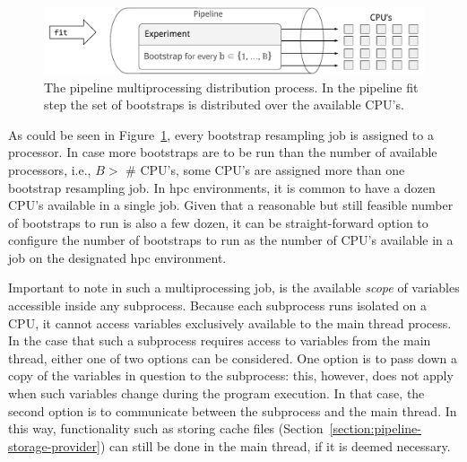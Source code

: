 \documentclass[../main.tex]{subfiles}
\begin{document}
\begin{figure}[ht]
    \centering
    \includegraphics[width=0.8\linewidth]{report/images/schematic-pipeline-multiprocessing.pdf}
    \caption{The pipeline multiprocessing distribution process. In the pipeline fit step the set of bootstraps is distributed over the available CPU's.}
    \label{fig:schematic-pipeline-multiprocessing}
\end{figure}

As could be seen in Figure~\ref{fig:schematic-pipeline-multiprocessing}, every bootstrap resampling job is assigned to a processor. In case more bootstraps are to be run than the number of available processors, i.e., $B >$ \# CPU's, some CPU's are assigned more than one bootstrap resampling job. In \gls{hpc} environments, it is common to have a dozen CPU's available in a single job. Given that a reasonable but still feasible number of bootstraps to run is also a few dozen, it can be straight-forward option to configure the number of bootstraps to run as the number of CPU's available in a job on the designated \gls{hpc} environment.

Important to note in such a multiprocessing job, is the available \textit{scope} of variables accessible inside any subprocess. Because each subprocess runs isolated on a CPU, it cannot access variables exclusively available to the main thread process. In the case that such a subprocess requires access to variables from the main thread, either one of two options can be considered. One option is to pass down a copy of the variables in question to the subprocess: this, however, does not apply when such variables change during the program execution. In that case, the second option is to communicate between the subprocess and the main thread. In this way, functionality such as storing cache files (Section~\ref{section:pipeline-storage-provider}) can still be done in the main thread, if it is deemed necessary.
\end{document}
